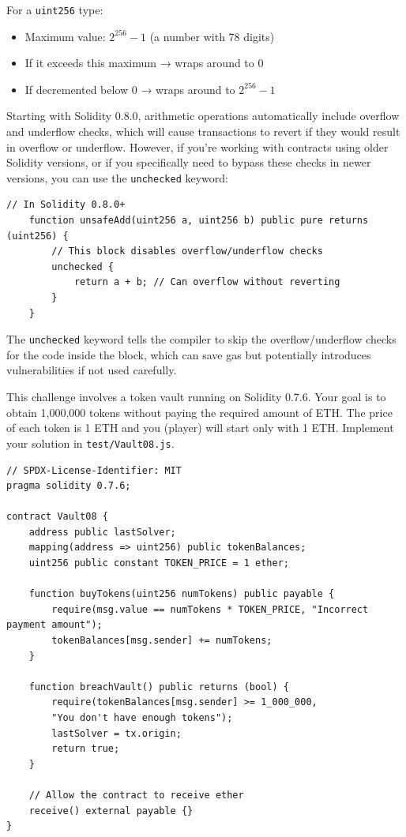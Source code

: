\documentclass[12pt]{article}
\begin{document}
\noindent
For a \texttt{uint256} type:
\begin{itemize}
    \item Maximum value: $2^{256} - 1$ (a number with 78 digits)
    \item If it exceeds this maximum → wraps around to 0
    \item If decremented below 0 → wraps around to $2^{256} - 1$
\end{itemize}

\noindent
Starting with Solidity 0.8.0, arithmetic operations automatically include overflow and underflow checks, which will cause transactions to revert if they would result in overflow or underflow. However, if you're working with contracts using older Solidity versions, or if you specifically need to bypass these checks in newer versions, you can use the \texttt{unchecked} keyword:

\noindent
\begin{minipage}{\textwidth}
    \begin{lstlisting}[language=Solidity]
    // In Solidity 0.8.0+
    function unsafeAdd(uint256 a, uint256 b) public pure returns (uint256) {
        // This block disables overflow/underflow checks
        unchecked {
            return a + b; // Can overflow without reverting
        }
    }
\end{lstlisting}
\end{minipage}

\noindent
The \texttt{unchecked} keyword tells the compiler to skip the overflow/underflow checks for the code inside the block, which can save gas but potentially introduces vulnerabilities if not used carefully.

\medskip
\noindent
This challenge involves a token vault running on Solidity 0.7.6. Your goal is to obtain 1,000,000 tokens without paying the required amount of ETH. The price of each token is 1 ETH and you (player) will start only with 1 ETH. Implement your solution in \texttt{test/Vault08.js}.

\noindent
\begin{minipage}{\textwidth}
    \begin{lstlisting}[language=Solidity]
// SPDX-License-Identifier: MIT
pragma solidity 0.7.6;

contract Vault08 {
    address public lastSolver;
    mapping(address => uint256) public tokenBalances;
    uint256 public constant TOKEN_PRICE = 1 ether;
    
    function buyTokens(uint256 numTokens) public payable {
        require(msg.value == numTokens * TOKEN_PRICE, "Incorrect payment amount");
        tokenBalances[msg.sender] += numTokens;
    }
    
    function breachVault() public returns (bool) {
        require(tokenBalances[msg.sender] >= 1_000_000, 
        "You don't have enough tokens");
        lastSolver = tx.origin;
        return true;
    }
    
    // Allow the contract to receive ether
    receive() external payable {}
}
\end{lstlisting}
\end{minipage}
\end{document}
